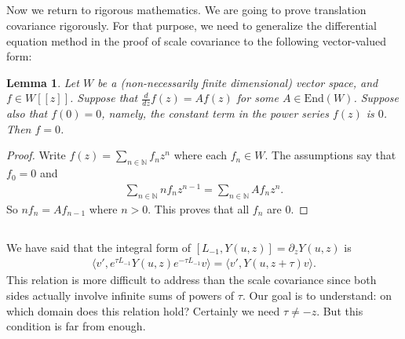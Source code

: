 \documentclass[12pt,a4paper,notitlepage]{article}
\theoremstyle{definition}
\theoremstyle{plain}
\newtheorem{lm}[df]{Lemma}
\newcommand{\End}{\mathrm{End}} %
\newcommand{\bigbk}[1]{\big\langle {#1}\big\rangle}
\newcommand{\Nbb}{\mathbb N}
\numberwithin{equation}{section}
\begin{document}
\subsection{}

Now we return to rigorous mathematics. We are going to prove translation covariance rigorously. For that purpose, we need to generalize the differential equation method in the proof of scale covariance to the following vector-valued form:

\begin{lm}\label{lb21}
Let $W$ be a (non-necessarily finite dimensional) vector space, and $f\in W[[z]]$. Suppose that $\frac d{dz}f(z)=Af(z)$ for some $A\in\End(W)$. Suppose also that $f(0)=0$, namely, the constant term in the power series $f(z)$ is $0$. Then $f=0$.	
\end{lm}



\begin{proof}
Write $f(z)=\sum_{n\in\Nbb}f_nz^n$ where each $f_n\in W$. The assumptions say that $f_0=0$ and
\begin{align*}
\sum_{n\in\Nbb} nf_nz^{n-1}=\sum_{n\in\Nbb} Af_nz^n.	
\end{align*}
So $nf_n=Af_{n-1}$ where $n>0$. This proves that all $f_n$ are $0$.
\end{proof}













\subsection{}

We have said that the integral form of $[L_{-1},Y(u,z)]=\partial_z Y(u,z)$ is
\begin{align}
\bigbk{v',e^{\tau L_{-1}}Y(u,z)e^{-\tau L_{-1}}v}=\bigbk{v',Y(u,z+\tau)v}.\label{eq24}	
\end{align}
This relation is more difficult to address than the scale covariance since both sides actually involve infinite sums of powers of $\tau$. Our goal is to understand: on which domain does this relation hold? Certainly we need $\tau\neq -z$. But this condition is far from enough.
\end{document}
